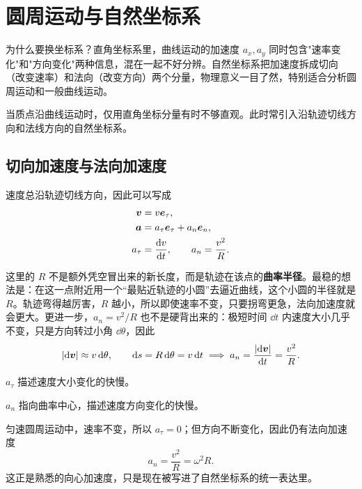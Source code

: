 \documentclass[lang=cn,11pt]{elegantbook}
\newcommand{\bridge}[1]{\begin{note}#1\end{note}}
\begin{document}
\section{圆周运动与自然坐标系}

\bridge{为什么要换坐标系？直角坐标系里，曲线运动的加速度 \(a_x,a_y\) 同时包含"速率变化"和"方向变化"两种信息，混在一起不好分辨。自然坐标系把加速度拆成切向（改变速率）和法向（改变方向）两个分量，物理意义一目了然，特别适合分析圆周运动和一般曲线运动。}

当质点沿曲线运动时，仅用直角坐标分量有时不够直观。此时常引入沿轨迹切线方向和法线方向的自然坐标系。

\subsection{切向加速度与法向加速度}

速度总沿轨迹切线方向，因此可以写成
\[
\begin{aligned}
\vb*{v}&=v\vb*{e}_\tau,\\
\vb*{a}&=a_\tau \vb*{e}_\tau + a_n \vb*{e}_n,\\
a_\tau&=\dv{v}{t},\qquad a_n=\frac{v^2}{R}.
\end{aligned}
\]

\begin{note}
这里的 \(R\) 不是额外凭空冒出来的新长度，而是轨迹在该点的\textbf{曲率半径}。最稳的想法是：在这一点附近用一个“最贴近轨迹的小圆”去逼近曲线，这个小圆的半径就是 \(R\)。轨迹弯得越厉害，\(R\) 越小，所以即使速率不变，只要拐弯更急，法向加速度就会更大。更进一步，\(a_n=v^2/R\) 也不是硬背出来的：极短时间 \(\dd t\) 内速度大小几乎不变，只是方向转过小角 \(\dd\theta\)，因此
\[
\abs{\dd \vb*{v}}\approx v\,\dd\theta,\qquad
\dd s=R\,\dd\theta=v\,\dd t
\implies a_n=\frac{\abs{\dd \vb*{v}}}{\dd t}=\frac{v^2}{R}.
\]
\end{note}

\begin{definition}[切向加速度]\label{def:tangential-acceleration}
\(a_\tau\) 描述速度大小变化的快慢。
\end{definition}

\begin{definition}[法向加速度]\label{def:normal-acceleration}
\(a_n\) 指向曲率中心，描述速度方向变化的快慢。
\end{definition}

\begin{note}
匀速圆周运动中，速率不变，所以 \(a_\tau=0\)；但方向不断变化，因此仍有法向加速度
\[
a_n=\frac{v^2}{R}=\omega^2R.
\]
这正是熟悉的向心加速度，只是现在被写进了自然坐标系的统一表达里。
\end{note}
\end{document}
